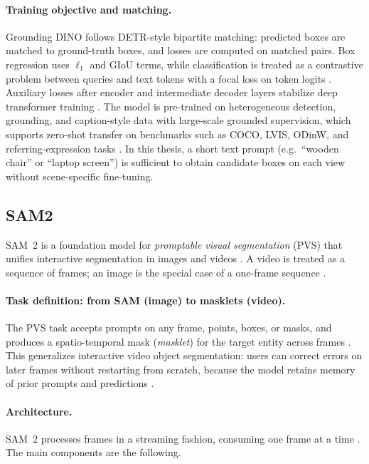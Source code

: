 \documentclass{report}
\begin{document}
\paragraph{Training objective and matching.}
Grounding DINO follows DETR-style bipartite matching: predicted boxes are matched to ground-truth boxes, and losses are computed on matched pairs. Box regression uses $\ell_1$ and GIoU terms, while classification is treated as a contrastive problem between queries and text tokens with a focal loss on token logits \cite{liu2023groundingdino}. Auxiliary losses after encoder and intermediate decoder layers stabilize deep transformer training \cite{liu2023groundingdino}. The model is pre-trained on heterogeneous detection, grounding, and caption-style data with large-scale grounded supervision, which supports zero-shot transfer on benchmarks such as COCO, LVIS, ODinW, and referring-expression tasks \cite{liu2023groundingdino}. In this thesis, a short text prompt (e.g.\ ``wooden chair'' or ``laptop screen'') is sufficient to obtain candidate boxes on each view without scene-specific fine-tuning.

\subsection{SAM2}
SAM~2 is a foundation model for \emph{promptable visual segmentation} (PVS) that unifies interactive segmentation in images and videos \cite{ravi2024sam2}. A video is treated as a sequence of frames; an image is the special case of a one-frame sequence \cite{ravi2024sam2}.

\paragraph{Task definition: from SAM (image) to masklets (video).}
The PVS task accepts prompts on any frame, points, boxes, or masks, and produces a spatio-temporal mask (\emph{masklet}) for the target entity across frames \cite{ravi2024sam2}. This generalizes interactive video object segmentation: users can correct errors on later frames without restarting from scratch, because the model retains memory of prior prompts and predictions \cite{ravi2024sam2}.


\paragraph{Architecture.}
SAM~2 processes frames in a streaming fashion, consuming one frame at a time \cite{ravi2024sam2}. The main components are the following.
\end{document}

